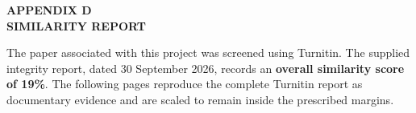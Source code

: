 \documentclass[14pt,a4paper,oneside]{extreport}
\begin{document}
\vspace{0.8cm}
{}
\begin{center}
{\bfseries\fontsize{16}{19}\selectfont APPENDIX D\\[0.35em]SIMILARITY REPORT}
\end{center}
The paper associated with this project was screened using Turnitin. The supplied integrity report, dated 30 September 2026, records an \textbf{overall similarity score of 19\%}. The following pages reproduce the complete Turnitin report as documentary evidence and are scaled to remain inside the prescribed margins.

\clearpage

\end{document}
